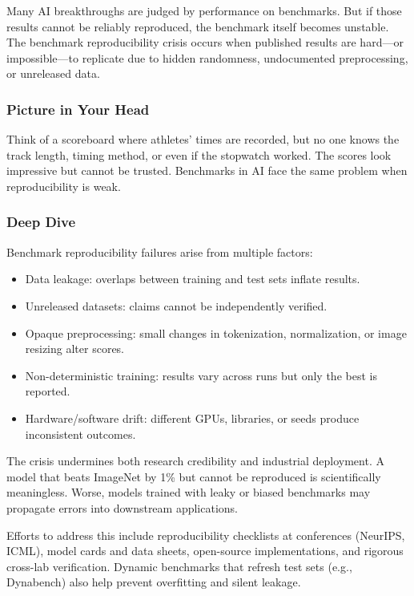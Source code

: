 \documentclass[
  letterpaper,
  DIV=11,
  numbers=noendperiod]{scrreprt}
\providecommand{\tightlist}{%
  \setlength{\itemsep}{0pt}\setlength{\parskip}{0pt}}
\begin{document}
Many AI breakthroughs are judged by performance on benchmarks. But if
those results cannot be reliably reproduced, the benchmark itself
becomes unstable. The benchmark reproducibility crisis occurs when
published results are hard---or impossible---to replicate due to hidden
randomness, undocumented preprocessing, or unreleased data.

\subsubsection{Picture in Your Head}\label{picture-in-your-head-97}

Think of a scoreboard where athletes' times are recorded, but no one
knows the track length, timing method, or even if the stopwatch worked.
The scores look impressive but cannot be trusted. Benchmarks in AI face
the same problem when reproducibility is weak.

\subsubsection{Deep Dive}\label{deep-dive-97}

Benchmark reproducibility failures arise from multiple factors:

\begin{itemize}
\tightlist
\item
  Data leakage: overlaps between training and test sets inflate results.
\item
  Unreleased datasets: claims cannot be independently verified.
\item
  Opaque preprocessing: small changes in tokenization, normalization, or
  image resizing alter scores.
\item
  Non-deterministic training: results vary across runs but only the best
  is reported.
\item
  Hardware/software drift: different GPUs, libraries, or seeds produce
  inconsistent outcomes.
\end{itemize}

The crisis undermines both research credibility and industrial
deployment. A model that beats ImageNet by 1\% but cannot be reproduced
is scientifically meaningless. Worse, models trained with leaky or
biased benchmarks may propagate errors into downstream applications.

Efforts to address this include reproducibility checklists at
conferences (NeurIPS, ICML), model cards and data sheets, open-source
implementations, and rigorous cross-lab verification. Dynamic benchmarks
that refresh test sets (e.g., Dynabench) also help prevent overfitting
and silent leakage.
\end{document}

